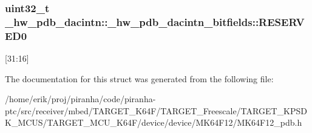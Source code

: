 \subsubsection[{\texorpdfstring{R\+E\+S\+E\+R\+V\+E\+D0}{RESERVED0}}]{\setlength{\rightskip}{0pt plus 5cm}uint32\+\_\+t \+\_\+hw\+\_\+pdb\+\_\+dacintn\+::\+\_\+hw\+\_\+pdb\+\_\+dacintn\+\_\+bitfields\+::\+R\+E\+S\+E\+R\+V\+E\+D0}\hypertarget{struct__hw__pdb__dacintn_1_1__hw__pdb__dacintn__bitfields_a25c83c76dda679f48cdbe9e4586e666b}{}\label{struct__hw__pdb__dacintn_1_1__hw__pdb__dacintn__bitfields_a25c83c76dda679f48cdbe9e4586e666b}
\mbox{[}31\+:16\mbox{]} 

The documentation for this struct was generated from the following file\+:\begin{DoxyCompactItemize}
\item 
/home/erik/proj/piranha/code/piranha-\/ptc/src/receiver/mbed/\+T\+A\+R\+G\+E\+T\+\_\+\+K64\+F/\+T\+A\+R\+G\+E\+T\+\_\+\+Freescale/\+T\+A\+R\+G\+E\+T\+\_\+\+K\+P\+S\+D\+K\+\_\+\+M\+C\+U\+S/\+T\+A\+R\+G\+E\+T\+\_\+\+M\+C\+U\+\_\+\+K64\+F/device/device/\+M\+K64\+F12/M\+K64\+F12\+\_\+pdb.\+h\end{DoxyCompactItemize}
